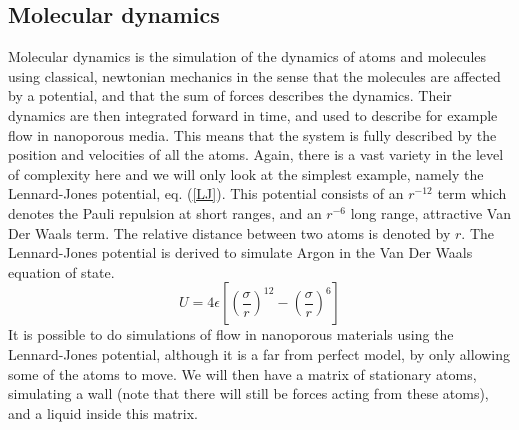 \documentclass[a4paper,english, 12pt, twoside]{article}
\begin{document}
\subsection{Molecular dynamics}\label{MD}
Molecular dynamics is the simulation of the dynamics of atoms and molecules using classical, newtonian mechanics in the sense that the molecules are affected by a potential, and that the sum of forces describes the dynamics. 
Their dynamics are then integrated forward in time, and used to describe for example flow in nanoporous media. 
This means that the system is fully described by the position and velocities of all the atoms. 
Again, there is a vast variety in the level of complexity here and we will only look at the simplest example, namely the Lennard-Jones potential, eq. (\ref{LJ}). 
This potential consists of an $r^{-12}$ term which denotes the Pauli repulsion at short ranges, and an $r^{-6}$ long range, attractive Van Der Waals term. 
The relative distance between two atoms is denoted by $r$. 
The Lennard-Jones potential is derived to simulate Argon in the Van Der Waals equation of state.
\begin{equation}\label{LJ}
 U = 4\epsilon\left[\left(\frac{\sigma}{r}\right)^{12}-\left(\frac{\sigma}{r}\right)^{6}\right]
\end{equation}
It is possible to do simulations of flow in nanoporous materials using the Lennard-Jones potential, although it is a far from perfect model, by only allowing some of the atoms to move. 
We will then have a matrix of stationary atoms, simulating a wall (note that there will still be forces acting from these atoms), and a liquid inside this matrix.
\end{document}
